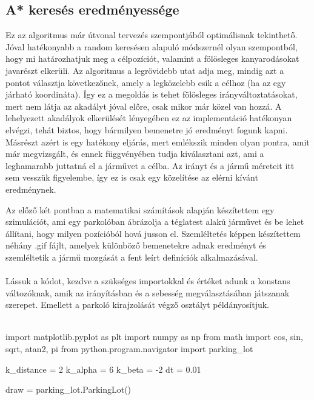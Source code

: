 \subsection{A* keresés eredményessége}
Ez az algoritmus már útvonal tervezés szempontjából optimálisnak tekinthető. Jóval hatékonyabb a random keresésen alapuló módszernél olyan szempontból, hogy mi határozhatjuk meg a célpozíciót, valamint a fölösleges kanyarodásokat javarészt elkerüli. Az algoritmus a legrövidebb utat adja meg, mindig azt a pontot választja következőnek, amely a legközelebb esik a célhoz (ha az egy járható koordináta). Így ez a megoldás is tehet fölösleges irányváltoztatásokat, mert nem látja az akadályt jóval előre, csak mikor már közel van hozzá. A lehelyezett akadályok elkerülését lényegében ez az implementáció hatékonyan elvégzi, tehát biztos, hogy bármilyen bemenetre jó eredményt fogunk kapni. Másrészt azért is egy hatékony eljárás, mert emlékszik minden olyan pontra, amit már megvizsgált, és ennek függvényében tudja kiválasztani azt, ami a leghamarabb juttatná el a járművet a célba. Az irányt és a jármű méreteit itt sem vesszük figyelembe, így ez is csak egy közelítése az elérni kívánt eredménynek.


Az előző két pontban a matematikai számítások alapján készítettem egy szimulációt, ami egy parkolóban ábrázolja a téglatest alakú járművet és be lehet állítani, hogy milyen pozícióból hová jusson el. Szemléltetés képpen készítettem néhány .gif fájlt, amelyek különböző bemenetekre adnak eredményt és szemléltetik a jármű mozgását a fent leírt definíciók alkalmazásával.
\\\\
Lássuk a kódot, kezdve a szükséges importokkal és értéket adunk a konstans változóknak, amik az irányításban és a sebesség megválasztásában játszanak szerepet. Emellett a parkoló kirajzolását végző osztályt példányosítjuk.
\\\\

\begin{python}
import matplotlib.pyplot as plt
import numpy as np
from math import cos, sin, sqrt, atan2, pi
from python.program.navigator import parking_lot

k_distance = 2
k_alpha = 6
k_beta = -2
dt = 0.01

draw = parking_lot.ParkingLot()
\end{python}

\bigskip

